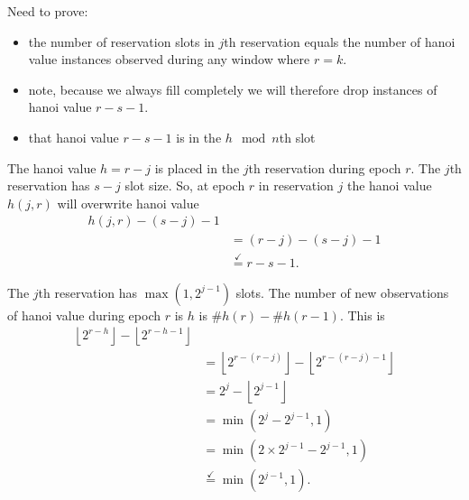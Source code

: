 Need to prove:
\begin{itemize}
\item the number of reservation slots in $j$th reservation equals the number of hanoi value instances observed during any window where $r = k$.
\item note, because we always fill completely we will therefore drop instances of hanoi value $r - s - 1$.
\item that hanoi value $r - s - 1$ is in the $h \mod n$th slot
\end{itemize}

The hanoi value $h = r - j$ is placed in the $j$th reservation during epoch $r$.
The $j$th reservation has $s - j$ slot size.
So, at epoch $r$ in reservation $j$ the hanoi value $h(j, r)$ will overwrite hanoi value
\begin{align*}
h(j, r) - (s - j) - 1 \\
&= (r - j) - (s - j) - 1 \\
&\stackrel{\checkmark}{=} r - s - 1.
\end{align*}

The $j$th reservation has $\max(1, 2^{j - 1})$ slots.
The number of new observations of hanoi value during epoch $r$ is $h$ is $\# h(r) -  \# h(r - 1)$.
This is
\begin{align*}
\left\lfloor 2 ^ {r - h} \right\rfloor - \left\lfloor 2 ^ {r - h - 1} \right\rfloor \\
&= \left\lfloor 2 ^{r - (r - j)} \right\rfloor - \left\lfloor 2 ^ {r - (r - j) - 1} \right\rfloor \\
&= 2^j - \left\lfloor 2 ^ {j - 1} \right\rfloor \\
&= \min(2^j - 2^{j - 1}, 1) \\
&= \min(2 \times 2^{j - 1} - 2^{j - 1}, 1) \\
&\stackrel{\checkmark}{=} \min(2^{j - 1}, 1).
\end{align*}
